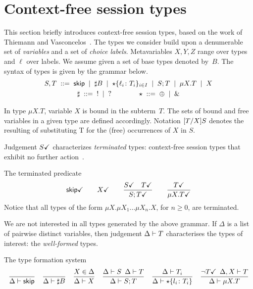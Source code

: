 \section{Context-free session types}
\label{sec:contextfreesession}

This section briefly introduces context-free session types, based on
the work of Thiemann and Vasconcelos~\cite{thiemann2016context}.
%
The types we consider build upon a denumerable set of \emph{variables}
and a set of \emph{choice labels}.  Metavariables $X,Y,Z$ range over
types and $\ell$ over labels.
%
We assume given a set of base types denoted by~$B$.
The syntax of types is given by the grammar below.
%
\begin{gather*}
  S,T \grmeq \skipk \grmor \sharp B \grmor 
  \star\{\ell_i\colon T_i\}_{i\in I} \grmor S;T \grmor \mu X.T \grmor X
  \\
  \sharp \grmeq {}! \grmor {}? 
  \qquad \qquad
  \star  \grmeq \oplus \grmor {}\&
\end{gather*}

In type $\mu X.T$, variable $X$ is bound in the subterm~$T$. The sets
of bound and free variables in a given type are defined
accordingly. Notation $\subs{T}{X}S$ denotes the resulting of
substituting T for the (free) occurrences of $X$ in $S$.

Judgement $\DONE S$ characterizes \emph{terminated} types:
context-free session types that exhibit no further
action~\cite{DBLP:journals/jacm/AcetoH92}.

\noindent The terminated predicate\hfill{} 
%
\begin{gather*}
  \DONE{\skipk}
  \qquad 
  \DONE X
  \qquad
  \frac{\DONE{S} \quad \DONE{T}}{\DONE{S; T}}
  \qquad
  \frac{\DONE T}{\DONE{\mu X.T}}
\end{gather*}
%
Notice that all types of the form $\mu X. \mu X_1\dots\mu X_n.X$, for
$n\ge0$, are terminated.

We are not interested in all types generated by the above grammar.
%
If $\Delta$ is a list of pairwise distinct variables, then judgement
$\isType T$ characterises the types of interest: the
\emph{well-formed} types.

\noindent The type formation system \hfill{}
%
\begin{gather*}
  \frac{} 
  {
    \isType \skipk
  }
  \quad
  \frac{}
  {
    \isType {\sharp B}
  }
  \quad
  \frac{
    X \in \Delta
  }{
    \isType{X}
  }
  \quad
  \frac{
    \isType{S}
    \enspace
    \isType{T}
  }{
    \isType{S;T}
  }
  \quad
  \frac{
    \isType{T_i}
  }{
    \isType{\star 
      \{ l_i \colon T_i\}}
  }
  \quad
  \frac{
    \neg\DONE T
    \enspace 
    \isType [\Delta, X] T
  }{
    \isType {\mu X. T}
  }
\end{gather*}

